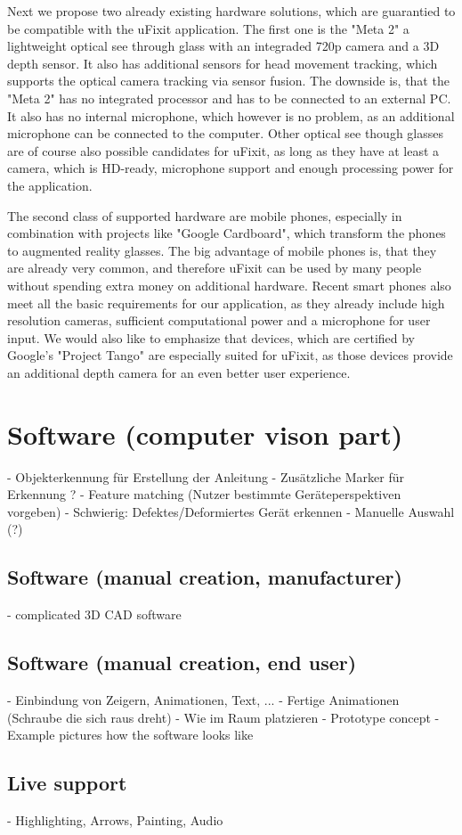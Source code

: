 Next we propose two already existing hardware solutions, which are guarantied to be compatible with the uFixit application. The first one is the "Meta 2" a lightweight optical see through glass with an integraded 720p camera and a 3D depth sensor. It also has additional sensors for head movement tracking, which supports the optical camera tracking via sensor fusion. The downside is, that the "Meta 2" has no integrated processor and has to be connected to an external PC. It also has no internal microphone, which however is no problem, as an additional microphone can be connected to the computer.
Other optical see though glasses are of course also possible candidates for uFixit, as long as they have at least a camera, which is HD-ready, microphone support and enough processing power for the application.

The second class of supported hardware are mobile phones, especially in combination with projects like "Google Cardboard", which transform the phones to augmented reality glasses. The big advantage of mobile phones is, that they are already very common, and therefore uFixit can be used by many people without spending extra money on additional hardware. Recent smart phones also meet all the basic requirements for our application, as they already include high resolution cameras, sufficient computational power and a microphone for user input. We would also like to emphasize that devices, which are certified by Google's "Project Tango" are especially suited for uFixit, as those devices provide an additional depth camera for an even better user experience.
				

\section{Software (computer vison part)}
	      - Objekterkennung für Erstellung der Anleitung
			- Zusätzliche Marker für Erkennung ?
			- Feature matching (Nutzer bestimmte Geräteperspektiven vorgeben)
			- Schwierig: Defektes/Deformiertes Gerät erkennen
			- Manuelle Auswahl (?)

\subsection{Software (manual creation, manufacturer)}
		- complicated 3D CAD software

\subsection{Software (manual creation, end user)}
		- Einbindung von Zeigern, Animationen, Text, ...
		- Fertige Animationen (Schraube die sich raus dreht)
		- Wie im Raum platzieren
		- Prototype concept
			- Example pictures how the software looks like

\subsection{Live support}
		- Highlighting, Arrows, Painting, Audio
